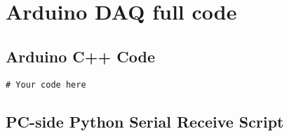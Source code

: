\section{Arduino DAQ full code}
\subsection{Arduino C++ Code}
\label{subsec:arduinoCppcode}
\begin{lstlisting}[style=cstyle, caption=C++ Code on Arduino, label=lst:SystemArchitecture7]
# Your code here
\end{lstlisting}

\subsection{PC-side Python Serial Receive Script}
